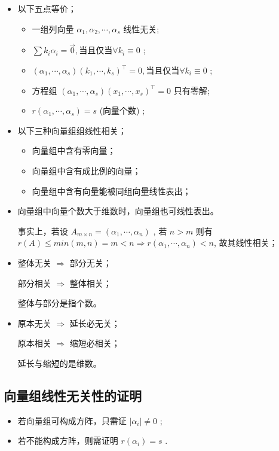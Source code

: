 \begin{itemize}
    \item 以下五点等价；
    \begin{itemize}
        \item 一组列向量 $ \alpha_1,\alpha_2,\cdots,\alpha_s $ 线性无关;
        \item $ \sum k_i\alpha_i = \vec 0,$当且仅当$ \forall k_i \equiv 0 $ ;
        \item $ (\alpha_1,\cdots,\alpha_s)(k_1,\cdots,k_s)^\top = 0,$当且仅当$ \forall k_i \equiv 0 $ ;
        \item 方程组 $ (\alpha_1,\cdots,\alpha_s)(x_1,\cdots,x_s)^\top = 0 $ 只有零解;
        \item $ r(\alpha_1,\cdots,\alpha_s) = s $ (\textrm{向量个数}) ;
    \end{itemize}
    \item 以下三种向量组组线性相关；
    \begin{itemize}
        \item 向量组中含有零向量；
        \item 向量组中含有成比例的向量；
        \item 向量组中含有向量能被同组向量线性表出；
    \end{itemize}
    \item 向量组中向量个数大于维数时，向量组也可线性表出。
    
    事实上，若设 $ A_{m\times n} = (\alpha_1,\cdots,\alpha_n) $ ,
    若 $ n > m $ 则有 $ r(A) \leq min(m,n) = m < n \Rightarrow r(\alpha_1,\cdots,\alpha_n) < n$,
    故其线性相关；
    \item 整体无关 $ \Rightarrow $ 部分无关；
    
    部分相关 $ \Rightarrow $ 整体相关；
    
    整体与部分是指个数。
    \item 原本无关 $ \Rightarrow $ 延长必无关；

    原本相关 $ \Rightarrow $ 缩短必相关；

    延长与缩短的是维数。
\end{itemize}

\subsection{向量组线性无关性的证明}


\begin{itemize}
    \item 若向量组可构成方阵，只需证 $ |\alpha_i| \neq 0 $ ;
    \item 若不能构成方阵，则需证明 $ r(\alpha_i) = s $ .
\end{itemize}

